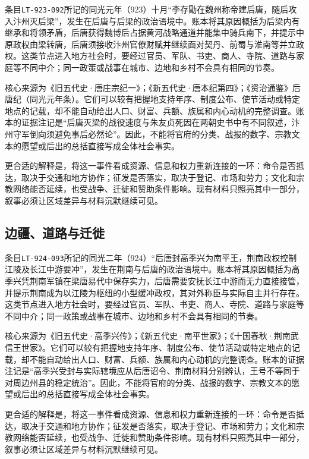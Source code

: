 条目\texttt{LT-923-092}所记的同光元年（923）十月“李存勖在魏州称帝建后唐，随后攻入汴州灭后梁”，发生在后唐与后梁的政治语境中。账本将其原因概括为后梁内有继承和将领矛盾，后唐获得魏博后占据黄河战略通道并能集中骑兵南下，并提示中原政权由梁转唐，后唐须接收汴州官僚财赋并继续面对契丹、前蜀与淮南等并立政权。这类节点进入地方社会时，要经过官员、军队、书吏、商人、寺院、道路与家庭等不同中介；同一政策或战事在城市、边地和乡村不会具有相同的节奏。

核心来源为《旧五代史·唐庄宗纪一》；《新五代史·唐本纪第四》；《资治通鉴》后唐纪（同光元年条）。它们可以较有把握地支持年序、制度公布、使节活动或特定地点的记载，却不能自动给出人口、财富、兵额、族属和内心动机的完整调查。账本的证据注记是“后唐灭梁的战役速度与朱友贞死因在两朝史书中有不同叙述，汴州守军倒向须避免事后必然论”。因此，不能将官府的分类、战报的数字、宗教文本的愿望或后出的总括直接写成全体社会事实。

更合适的解释是，将这一事件看成资源、信息和权力重新连接的一环：命令是否抵达，取决于交通和地方协作；征发是否落实，取决于登记、市场和劳力；文化和宗教网络能否延续，也受战争、迁徙和赞助条件影响。现有材料只照亮其中一部分，叙事必须让区域差异与材料沉默继续可见。

\subsection{边疆、道路与迁徙}

条目\texttt{LT-924-093}所记的同光二年（924）“后唐封高季兴为南平王，荆南政权控制江陵及长江中游要冲”，发生在荆南与后唐的政治语境中。账本将其原因概括为高季兴凭荆南军镇在梁唐易代中保存实力，后唐需要安抚长江中游而无力直接接管，并提示荆南成为以江陵为枢纽的小型缓冲政权，其对外称臣与实际自主并行存在。这类节点进入地方社会时，要经过官员、军队、书吏、商人、寺院、道路与家庭等不同中介；同一政策或战事在城市、边地和乡村不会具有相同的节奏。

核心来源为《旧五代史·高季兴传》；《新五代史·南平世家》；《十国春秋·荆南武信王世家》。它们可以较有把握地支持年序、制度公布、使节活动或特定地点的记载，却不能自动给出人口、财富、兵额、族属和内心动机的完整调查。账本的证据注记是“高季兴受封与实际辖境应从后唐诏令、荆南材料分别辨认，王号不等同于对周边州县的稳定统治”。因此，不能将官府的分类、战报的数字、宗教文本的愿望或后出的总括直接写成全体社会事实。

更合适的解释是，将这一事件看成资源、信息和权力重新连接的一环：命令是否抵达，取决于交通和地方协作；征发是否落实，取决于登记、市场和劳力；文化和宗教网络能否延续，也受战争、迁徙和赞助条件影响。现有材料只照亮其中一部分，叙事必须让区域差异与材料沉默继续可见。

